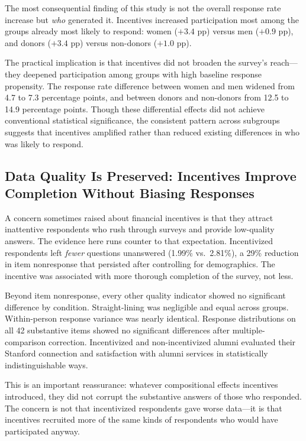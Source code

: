 The most consequential finding of this study is not the overall response rate increase
but \emph{who} generated it. Incentives increased participation most among the groups
already most likely to respond: women ($+3.4$ pp) versus men ($+0.9$ pp), and donors
($+3.4$ pp) versus non-donors ($+1.0$ pp).

The practical implication is that incentives did not broaden the survey's reach---they
deepened participation among groups with high baseline response propensity. The response
rate difference between women and men widened from 4.7 to 7.3 percentage points, and
between donors and non-donors from 12.5 to 14.9 percentage points. Though these
differential effects did not achieve conventional statistical significance, the consistent
pattern across subgroups suggests that incentives amplified rather than reduced existing
differences in who was likely to respond.

\subsection{Data Quality Is Preserved: Incentives Improve Completion Without Biasing
  Responses}

A concern sometimes raised about financial incentives is that they attract inattentive
respondents who rush through surveys and provide low-quality answers. The evidence here
runs counter to that expectation. Incentivized respondents left \emph{fewer} questions
unanswered (1.99\% vs.\ 2.81\%), a 29\% reduction in item nonresponse that persisted
after controlling for demographics. The incentive was associated with more thorough
completion of the survey, not less.

Beyond item nonresponse, every other quality indicator showed no significant difference
by condition. Straight-lining was negligible and equal across groups. Within-person
response variance was nearly identical. Response distributions on all 42 substantive
items showed no significant differences after multiple-comparison correction. Incentivized
and non-incentivized alumni evaluated their Stanford connection and satisfaction with
alumni services in statistically indistinguishable ways.

This is an important reassurance: whatever compositional effects incentives introduced,
they did not corrupt the substantive answers of those who responded. The concern is not
that incentivized respondents gave worse data---it is that incentives recruited more of
the same kinds of respondents who would have participated anyway.


